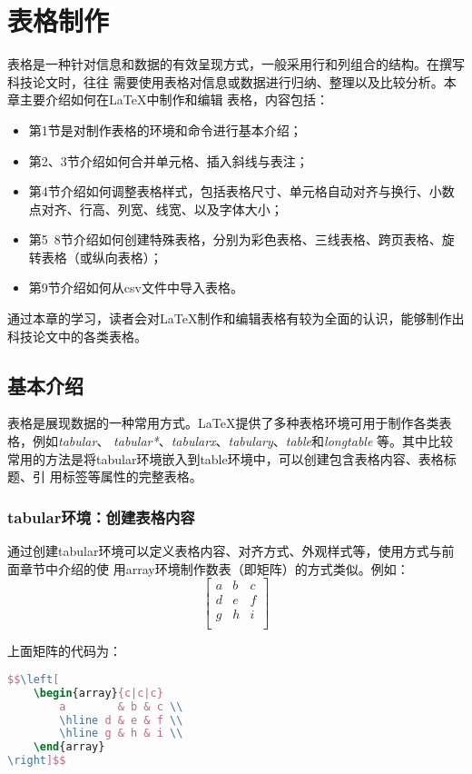 \chapter{表格制作}

表格是一种针对信息和数据的有效呈现方式，一般采用行和列组合的结构。在撰写科技论文时，往往
需要使用表格对信息或数据进行归纳、整理以及比较分析。本章主要介绍如何在LaTeX中制作和编辑
表格，内容包括：
\begin{itemize}
    \item 第1节是对制作表格的环境和命令进行基本介绍；
    \item 第2、3节介绍如何合并单元格、插入斜线与表注；
    \item 第4节介绍如何调整表格样式，包括表格尺寸、单元格自动对齐与换行、小数点对齐、行高、列宽、线宽、以及字体大小；
    \item 第5~8节介绍如何创建特殊表格，分别为彩色表格、三线表格、跨页表格、旋转表格（或纵向表格）；
    \item 第9节介绍如何从csv文件中导入表格。
\end{itemize}

通过本章的学习，读者会对LaTeX制作和编辑表格有较为全面的认识，能够制作出科技论文中的各类表格。

\section{基本介绍}
表格是展现数据的一种常用方式。LaTeX提供了多种表格环境可用于制作各类表格，例如\emph{tabular}、
\emph{tabular*}、\emph{tabularx}、\emph{tabulary}、\emph{table}和\emph{longtable}
等。其中比较常用的方法是将tabular环境嵌入到table环境中，可以创建包含表格内容、表格标题、引
用标签等属性的完整表格。

\subsection{tabular环境：创建表格内容}
通过创建tabular环境可以定义表格内容、对齐方式、外观样式等，使用方式与前面章节中介绍的使
用array环境制作数表（即矩阵）的方式类似。例如：
$$\left[
        \begin{array}{c|c|c}
            a        & b & c \\
            \hline d & e & f \\
            \hline g & h & i \\
        \end{array}
        \right]$$

上面矩阵的代码为：
\begin{lstlisting}[language=TeX]
$$\left[
    \begin{array}{c|c|c}
        a        & b & c \\
        \hline d & e & f \\
        \hline g & h & i \\
    \end{array}
\right]$$
\end{lstlisting}

